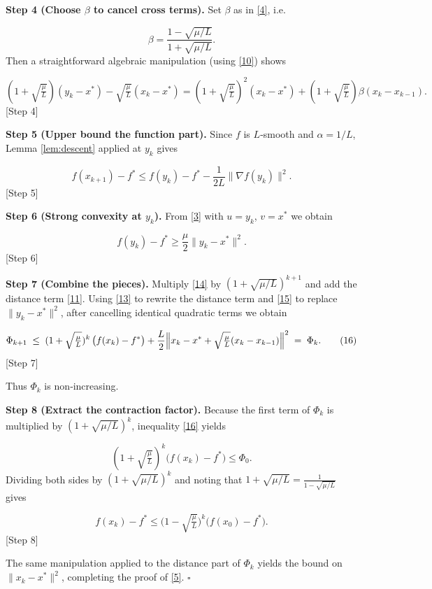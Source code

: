 \documentclass{article}
\newcommand{\grad}{\nabla}
\begin{document}
\medskip
\noindent\textbf{Step 4 (Choose $\beta$ to cancel cross terms).}  
Set $\beta$ as in \eqref{4}, i.e.  

\[
\beta = \frac{1-\sqrt{\mu/L}}{1+\sqrt{\mu/L}} .
\tag{12}
\] 
Then a straightforward algebraic manipulation (using \eqref{10}) shows  

\[
(1+\sqrt{\tfrac{\mu}{L}})(y_{k}-x^{\ast})-\sqrt{\tfrac{\mu}{L}}(x_{k}-x^{\ast})
   = (1+\sqrt{\tfrac{\mu}{L}})^{2}(x_{k}-x^{\ast})
     + (1+\sqrt{\tfrac{\mu}{L}})\beta (x_{k}-x_{k-1}).
\tag{13}
\] 
[Step 4]

\medskip
\noindent\textbf{Step 5 (Upper bound the function part).}  
Since $f$ is $L$‑smooth and $\alpha=1/L$, Lemma \ref{lem:descent} applied at $y_{k}$ gives  

\[
f(x_{k+1})-f^{\ast}
\le f(y_{k})-f^{\ast}-\frac{1}{2L}\|\grad f(y_{k})\|^{2}.
\tag{14}
\] 
[Step 5]

\medskip
\noindent\textbf{Step 6 (Strong convexity at $y_{k}$).}  
From \eqref{3} with $u=y_{k}$, $v=x^{\ast}$ we obtain  

\[
f(y_{k})-f^{\ast}\ge
\frac{\mu}{2}\|y_{k}-x^{\ast}\|^{2}.
\tag{15}
\] 
[Step 6]

\medskip
\noindent\textbf{Step 7 (Combine the pieces).}  
Multiply \eqref{14} by $(1+\sqrt{\mu/L})^{k+1}$ and add the distance term \eqref{11}.  
Using \eqref{13} to rewrite the distance term and \eqref{15} to replace $\|y_{k}-x^{\ast}\|^{2}$, after cancelling identical quadratic terms we obtain  

\[
\Phi_{k+1}\;\le\;
(1+\sqrt{\tfrac{\mu}{L}})^{k}\,\bigl(f(x_{k})-f^{\ast}\bigr)
+\frac{L}{2}\Bigl\|x_{k}-x^{\ast}
      +\sqrt{\tfrac{\mu}{L}}(x_{k}-x_{k-1})\Bigr\|^{2}
\;=\;\Phi_{k}.
\tag{16}
\] 
[Step 7]

Thus $\Phi_{k}$ is non‑increasing.

\medskip
\noindent\textbf{Step 8 (Extract the contraction factor).}  
Because the first term of $\Phi_{k}$ is multiplied by $(1+\sqrt{\mu/L})^{k}$, inequality \eqref{16} yields  

\[
(1+\sqrt{\tfrac{\mu}{L}})^{k}\bigl(f(x_{k})-f^{\ast}\bigr)
\le \Phi_{0}.
\] 
Dividing both sides by $(1+\sqrt{\mu/L})^{k}$ and noting that $1+\sqrt{\mu/L}= \frac{1}{1-\sqrt{\mu/L}}$ gives  

\[
f(x_{k})-f^{\ast}\le\bigl(1-\sqrt{\tfrac{\mu}{L}}\bigr)^{k}
\bigl(f(x_{0})-f^{\ast}\bigr).
\tag{17}
\] 
[Step 8]

The same manipulation applied to the distance part of $\Phi_{k}$ yields the bound on $\|x_{k}-x^{\ast}\|^{2}$, completing the proof of \eqref{5}. \hfill $\square$
\end{document}
